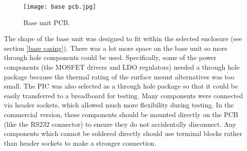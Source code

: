 \begin{figure}[htbp]
	\centering
	\texttt{[image: base pcb.jpg]}
	\caption{Base unit PCB.}
	\label{fig: base pcb}
\end{figure}

The shape of the base unit was designed to fit within the selected enclosure (see section \ref{base casing}). There was a lot more space on the base unit so more through hole components could be used. Specifically, some of the power components (the MOSFET drivers and LDO regulators) needed a through hole package because the thermal rating of the surface mount alternatives was too small. The PIC was also selected as a through hole package so that it could be easily transferred to a breadboard for testing. Many components were connected via header sockets, which allowed much more flexibility during testing. In the commercial version, these components should be mounted directly on the PCB (like the RS232 connector) to ensure they do not accidentally disconnect. Any components which cannot be soldered directly should use terminal blocks rather than header sockets to make a stronger connection.\\